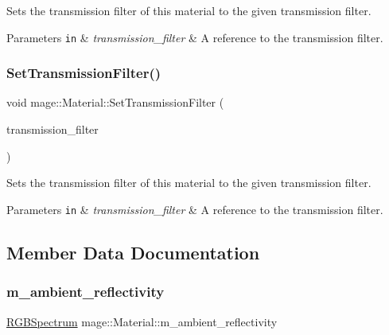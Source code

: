 Sets the transmission filter of this material to the given transmission filter.


\begin{DoxyParams}[1]{Parameters}
\mbox{\tt in}  & {\em transmission\+\_\+filter} & A reference to the transmission filter. \\
\hline
\end{DoxyParams}
\hypertarget{structmage_1_1_material_abc6f63bd40b00c81bc799ef1f2ca01e9}{}\label{structmage_1_1_material_abc6f63bd40b00c81bc799ef1f2ca01e9} 
\subsubsection{\texorpdfstring{Set\+Transmission\+Filter()}{SetTransmissionFilter()}\hspace{0.1cm}{\footnotesize\ttfamily [2/2]}}
{\footnotesize\ttfamily void mage\+::\+Material\+::\+Set\+Transmission\+Filter (\begin{DoxyParamCaption}\item[{\hyperlink{structmage_1_1_r_g_b_spectrum}{R\+G\+B\+Spectrum} \&\&}]{transmission\+\_\+filter }\end{DoxyParamCaption})\hspace{0.3cm}{\ttfamily [noexcept]}}

Sets the transmission filter of this material to the given transmission filter.


\begin{DoxyParams}[1]{Parameters}
\mbox{\tt in}  & {\em transmission\+\_\+filter} & A reference to the transmission filter. \\
\hline
\end{DoxyParams}


\subsection{Member Data Documentation}
\hypertarget{structmage_1_1_material_ad8fb842410fe751ad220185271a00448}{}\label{structmage_1_1_material_ad8fb842410fe751ad220185271a00448} 
\subsubsection{\texorpdfstring{m\+\_\+ambient\+\_\+reflectivity}{m\_ambient\_reflectivity}}
{\footnotesize\ttfamily \hyperlink{structmage_1_1_r_g_b_spectrum}{R\+G\+B\+Spectrum} mage\+::\+Material\+::m\+\_\+ambient\+\_\+reflectivity\hspace{0.3cm}{\ttfamily [private]}}

